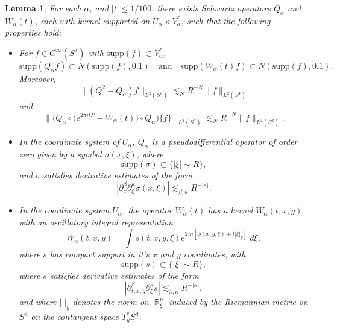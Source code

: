 \documentclass[dvipsnames,letterpaper,12pt]{article}
\DeclareMathOperator{\RR}{\mathbb{R}}
\newtheorem{lemma}[theorem]{Lemma}
\begin{document}
\begin{lemma} \label{pseudodifferentialCoordinateLemma}
    For each $\alpha$, and $|t| \leq 1/100$, there exists Schwartz operators $Q_\alpha$ and $W_\alpha(t)$, each with kernel supported on $U_\alpha \times V^*_\alpha$, such that the following properties hold:
    \begin{itemize}
        \item For $f \in C^\infty(S^d)$ with $\text{supp}(f) \subset V^*_\alpha$,
        \[ \text{supp}(Q_\alpha f) \subset N(\text{supp}(f), 0.1) \quad\text{and}\quad \text{supp}(W_\alpha(t) f) \subset N(\text{supp}(f), 0.1). \]
        Moreover,
        \[ \| (Q^2 - Q_\alpha) f \|_{L^2(S^d)} \lesssim_N R^{-N} \| f \|_{L^2(S^d)} \]
        and
        \[ \bigg\| \Big(Q_\alpha \circ \Big( e^{2 \pi i t P} - W_\alpha(t) \Big) \circ Q_\alpha \Big) \{ f \} \bigg\|_{L^2(S^d)} \lesssim_N R^{-N} \| f \|_{L^2(S^d)}. \]

        \item In the coordinate system of $U_\alpha$, $Q_\alpha$ is a pseudodifferential operator of order zero given by a symbol $\sigma(x,\xi)$, where
        \[ \text{supp}(\sigma) \subset \{ |\xi| \sim R \}, \]
        and $\sigma$ satisfies derivative estimates of the form
        \[ |\partial^\beta_x \partial^\kappa_\xi \sigma(x,\xi)| \lesssim_{\beta,\kappa} R^{-|\kappa|}. \]

        \item In the coordinate system $U_\alpha$, the operator $W_\alpha(t)$ has a kernel $W_\alpha(t,x,y)$ with an oscillatory integral representation
        \[ W_\alpha(t,x,y) = \int s(t,x,y,\xi) e^{2 \pi i [ \phi(x,y,\xi) + t |\xi|_y ]}\; d\xi, \]
        where $s$ has compact support in it's $x$ and $y$ coordinates, with
        \[ \text{supp}(s) \subset \{ |\xi| \sim R \}, \]
        where $s$ satisfies derivative estimates of the form
        \[ | \partial_{t,x,y}^\beta \partial_\xi^\kappa s | \lesssim_{\beta, \kappa} R^{- |\kappa|}, \]
        and where $| \cdot |_y$ denotes the norm on $\RR^n_\xi$ induced by the Riemannian metric on $S^d$ on the contangent space $T^*_y S^d$.
    \end{itemize}
\end{lemma}
\end{document}
